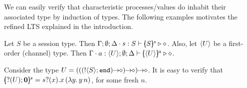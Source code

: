\noi We can easily verify that characteristic processes/values  
do inhabit  their associated type by induction of types. 
The following examples motivates the refined 
LTS explained in %
the introduction.

\begin{proposition}
		Let $S$ be a session type. Then $\Gamma; \emptyset; \Delta \cdot s: S \vdash [\!\!(S)\!\!]^{s} \triangleright \diamond$.
		Also, let $\langle U \rangle$ be a first-order (channel) type. Then $\Gamma \cdot a: \langle U \rangle; \emptyset; \Delta \vdash [\!\!(\langle U \rangle)\!\!]^{a} \triangleright \diamond$.
\end{proposition}



\begin{example}
	Consider the type $U = \shot{(\shot{(\shot{(\btout{S} \tinact)})})}$.
	It is easy to verify that %
	$[\!\!(? (U) ; \mathbf{0})\!\!]^{s} = s ? (x) . x\, {(\lambda y.\,y\, {n})}$, for some fresh $n$.
\end{example}


